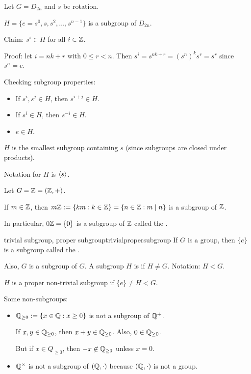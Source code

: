 \documentclass[12pt,letterpaper]{report}
\begin{document}
\begin{ex}
  Let $G = D_{2n}$ and $s$ be rotation.

  $H = \{ e = s^0, s, s^2, \ldots, s^{n - 1} \}$ is a subgroup of $D_{2n}$.
\end{ex}

\begin{exerproof}
  Claim: $s^i \in H$ for all $i \in \mathbb{Z}$.

  Proof: let $i = nk + r$ with $0 \leq r < n$.
  Then $s^i = s^{nk + r} = (s^n)^k s^r = s^r$ since $s^n = e$.

  Checking subgroup properties:
  \begin{itemize}
    \item If $s^i, s^j \in H$, then $s^{i + j} \in H$.
    \item If $s^i \in H$, then $s^{-i} \in H$.
    \item $e \in H$.
  \end{itemize}
\end{exerproof}

$H$ is the smallest subgroup containing $s$ (since subgroups are closed under products).

Notation for $H$ is $\langle s\rangle$.

\begin{ex}
  Let $G = \mathbb{Z} = (\mathbb{Z}, +)$.

  If $m \in \mathbb{Z}$, then
  $m\mathbb{Z} := \{ km : k \in \mathbb{Z} \} = \{ n \in \mathbb{Z} : m \mid n \}$ is a subgroup of
  $\mathbb{Z}$.

  In particular, $0\mathbb{Z} = \{0\}$ is a subgroup of $\mathbb{Z}$ called the .
\end{ex}

\begin{defn}{trivial subgroup, proper subgroup}{trivialpropersubgroup}
  If $G$ is a group, then $\{e\}$ is a subgroup called the .

  Also, $G$ is a subgroup of $G$.
  A subgroup $H$ is  if $H \neq G$.
  Notation: $H < G$.
\end{defn}

$H$ is a proper non-trivial subgroup if $\{e\} \neq H < G$.

\begin{ex}
  Some non-subgroups:
  \begin{itemize}
    \item
    $\mathbb{Q}_{\geq 0} := \{x \in \mathbb{Q} : x \geq 0\}$ is not a subgroup of $\mathbb{Q}^+$.

    If $x, y \in \mathbb{Q}_{\geq 0}$, then $x + y \in \mathbb{Q}_{\geq 0}$.
    Also, $0 \in \mathbb{Q}_{\geq 0}$.

    But if $x \in Q_{\geq 0}$, then $-x \not\in \mathbb{Q}_{\geq 0}$ unless $x = 0$.
    \item
    $\mathbb{Q}^\times$ is not a subgroup of $(\mathbb{Q}, \cdot)$ because $(\mathbb{Q}, \cdot)$ is
    not a group.
  \end{itemize}
\end{ex}
\end{document}
